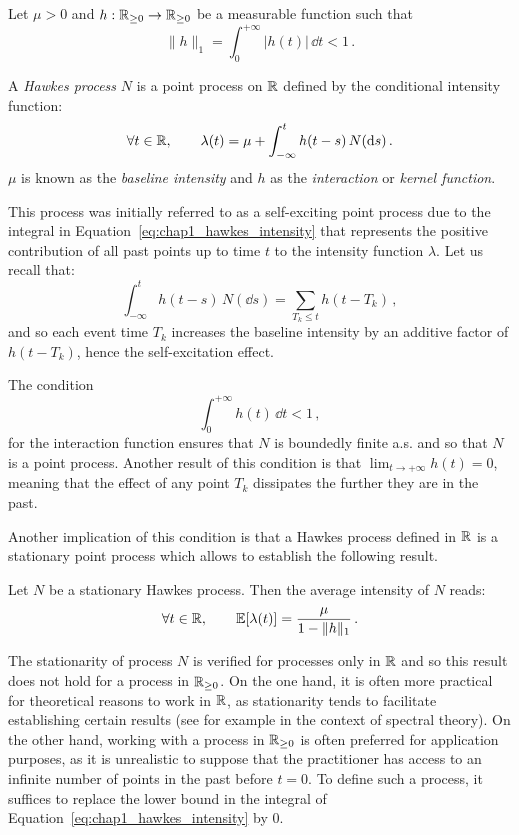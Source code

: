 \begin{definition}\label{def:chap1_hawkes_process}
    Let $\mu>0$ and $h:{\mathbb R}_{\geq 0}\to{\mathbb R}_{\geq 0}$ be a measurable function such that \[\|h\|_1 = \int_{0}^{+\infty}{\lvert h(t)\rvert\,\dd t} < 1\,.\]

    A \emph{Hawkes process} $N$ is a point process on ${\mathbb R}$ defined by the conditional intensity function:
    \begin{equation}\label{eq:chap1_hawkes_intensity}
        \forall t\in{\mathbb R},\qquad \lambda(t) = \mu + \int_{-\infty}^{t}{h(t-s)\,N({\mathrm{d}} s)}\,.
    \end{equation}
    $\mu$ is known as the \emph{baseline intensity} and $h$ as the \emph{interaction} or \emph{kernel function}.
\end{definition}
This process was initially referred to as a self-exciting point process due to the integral in Equation~\eqref{eq:chap1_hawkes_intensity} that represents the positive contribution of all past points up to time $t$ to the intensity function $\lambda$. 
Let us recall that:
\[\int_{-\infty}^{t}{h(t-s)\,N(\dd s)} = \sum_{T_k \leq t}{h(t - T_k)}\,,\]
and so each event time $T_k$ increases the baseline intensity by an additive factor of $h(t - T_k)$, hence the self-excitation effect.

The condition \[\int_{0}^{+\infty}{h(t)\,\dd t} < 1\,,\] for the interaction function ensures that $N$ is boundedly finite a.s. and so that $N$ is a point process.
Another result of this condition is that $\lim_{t\to+\infty}h(t) = 0$, meaning that the effect of any point $T_k$ dissipates the further they are in the past.

Another implication of this condition is that a Hawkes process defined in ${\mathbb R}$ is a stationary point process \parencite[Lemma 1]{Hawkes1974} which allows to establish the following result.

\begin{proposition}\parencite[Equation (9)]{Hawkes1971}
    Let $N$ be a stationary Hawkes process.
    Then the average intensity of $N$ reads:
    \[\forall t\in{\mathbb R},\qquad {\mathbb E}[\lambda(t)] = \frac{\mu}{1-\|h\|_1}\,.\]
\end{proposition}
The stationarity of process $N$ is verified for processes only in ${\mathbb R}$ and so this result does not hold for a process in ${\mathbb R}_{\geq 0}$.
On the one hand, it is often more practical for theoretical reasons to work in ${\mathbb R}$, as stationarity tends to facilitate establishing certain results (see \textcite{Hawkes1971} for example in the context of spectral theory).
On the other hand, working with a process in ${\mathbb R}_{\geq 0}$ is often preferred for application purposes, as it is unrealistic to suppose that the practitioner has access to an infinite number of points in the past before $t=0$. To define such a process, it suffices to replace the lower bound in the integral of Equation~\eqref{eq:chap1_hawkes_intensity} by $0$.


